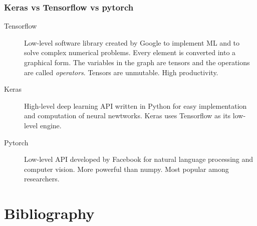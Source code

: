 \documentclass{beamer}
\begin{document}
\begin{frame}
    \frametitle{Keras vs Tensorflow vs pytorch}
    \begin{description}
        \item[Tensorflow] Low-level software library created by Google to implement ML and to solve complex numerical problems. Every element is converted into a graphical form. The variables in the graph are tensors and the operations are called {\em operators}. Tensors are unmutable. High productivity.
        \item[Keras] High-level deep learning API written in Python for easy implementation and computation of neural newtworks. Keras uses Tensorflow as its low-level engine.
        \item[Pytorch] Low-level API developed by Facebook for natural language processing and computer vision. More powerful than numpy. Most popular among researchers.
    \end{description}
\end{frame}




\section{Bibliography}



\end{document}
